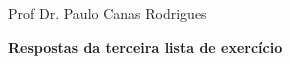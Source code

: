 
\usepackage{fullpage}      %
\usepackage{indentfirst}   %



% 
\noindent Prof Dr. Paulo Canas Rodrigues
\\

\noindent \centerline{\textbf{Respostas da terceira lista de exercício}}
\\






